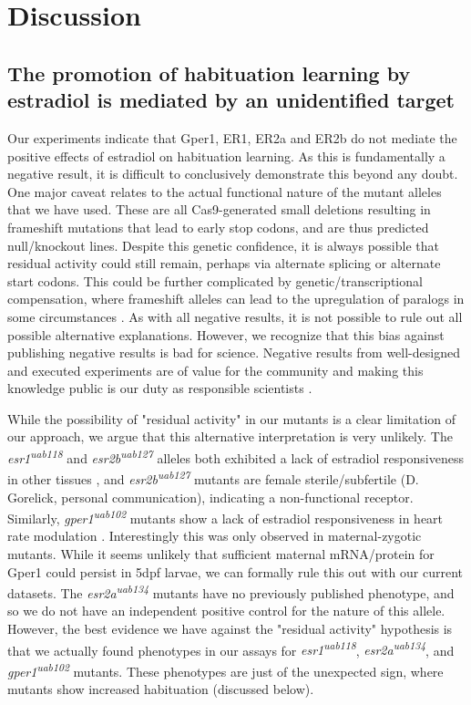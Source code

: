 \documentclass[9.5pt,lineno]{RandlettLab_elife}
\begin{document}
{\section{Discussion}

\subsection{The promotion of habituation learning by estradiol is mediated by an unidentified target} 
Our experiments indicate that Gper1, ER1, ER2a and ER2b do not mediate the positive effects of estradiol on habituation learning. 
As this is fundamentally a negative result, it is difficult to conclusively demonstrate this beyond any doubt. 
One major caveat relates to the actual functional nature of the mutant alleles that we have used. 
These are all Cas9-generated small deletions resulting in frameshift mutations that lead to early stop codons, and are thus predicted null/knockout lines. 
Despite this genetic confidence, it is always possible that residual activity could still remain, perhaps via alternate splicing or alternate start codons. 
This could be further complicated by genetic/transcriptional compensation, where frameshift alleles can lead to the upregulation of paralogs in some circumstances \citep{El-Brolosy2019-uq}.
As with all negative results, it is not possible to rule out all possible alternative explanations. 
However, we recognize that this bias against publishing negative results is bad for science. 
Negative results from well-designed and executed experiments are of value for the community and making this knowledge public is our duty as responsible scientists \citep{Mlinaric2017-kr}. 

While the possibility of "residual activity" in our mutants is a clear limitation of our approach, we argue that this alternative interpretation is very unlikely. The \emph{esr1\textsuperscript{uab118}} and \emph{esr2b\textsuperscript{uab127}} alleles both exhibited a lack of estradiol responsiveness in other tissues \citep{Romano2017-ep}, and \emph{esr2b\textsuperscript{uab127}} mutants are female sterile/subfertile (D. Gorelick, personal communication), indicating a non-functional receptor.
Similarly, \emph{gper1\textsuperscript{uab102}} mutants show a lack of estradiol responsiveness in heart rate modulation \citep{Romano2017-ep}. 
Interestingly this was only observed in maternal-zygotic mutants. 
While it seems unlikely that sufficient maternal mRNA/protein for Gper1 could persist in 5dpf larvae, we can formally rule this out with our current datasets. 
The \emph{esr2a\textsuperscript{uab134}} mutants have no previously published phenotype, and so we do not have an independent positive control for the nature of this allele. However, the best evidence we have against the "residual activity" hypothesis is that we actually found phenotypes in our assays for \emph{esr1\textsuperscript{uab118}}, \emph{esr2a\textsuperscript{uab134}},  and \emph{gper1\textsuperscript{uab102}} mutants. 
These phenotypes are just of the unexpected sign, where mutants show increased habituation (discussed below). 

}
\end{document}
